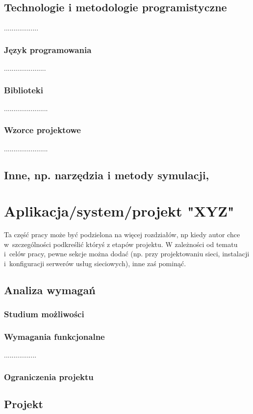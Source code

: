\documentclass[12pt]{report}
\begin{document}
\section{Technologie i metodologie programistyczne}
..................
\subsection{Język programowania}
......................
\subsection{Biblioteki}
.......................
\subsection{Wzorce projektowe}
.......................

\section{Inne, np. narzędzia i metody symulacji, }

\chapter{Aplikacja/system/projekt "XYZ"} \label{rozdz.czesc.prakt}
Ta część pracy może być podzielona na więcej rozdziałów, np kiedy autor chce
w~szczególności podkreślić któryś z etapów projektu. W zależności od tematu i~celów pracy, pewne sekcje można dodać (np. przy projektowaniu sieci, instalacji
i~konfiguracji serwerów usług sieciowych), inne zaś pominąć.

\section{Analiza wymagań}
\subsection{Studium możliwości}
\subsection{Wymagania funkcjonalne}
.................
\subsection{Ograniczenia projektu}

\section{Projekt}
\end{document}
